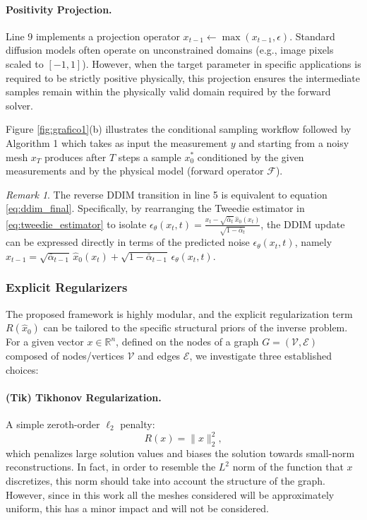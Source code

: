 \documentclass[a4paper,11pt]{article}
\renewcommand{\varepsilon}{\epsilon}
\newcommand{\R}{{\mathbb R}}
\theoremstyle{definition}
\theoremstyle{plain}
\theoremstyle{remark}
\newtheorem{rem}{Remark}
\begin{document}
\paragraph{Positivity Projection.} Line 9 implements a projection operator $x_{t-1} \leftarrow \max(x_{t-1}, \epsilon)$. Standard diffusion models often operate on unconstrained domains (e.g., image pixels scaled to $[-1, 1]$). However, when the target parameter in specific applications  is required to be strictly positive physically, this projection ensures the intermediate samples remain within the physically valid domain required by the forward solver.

\vspace{0.2cm}

Figure \ref{fig:grafico1}(b) illustrates the conditional sampling workflow followed by Algorithm 1 which takes as input the measurement $y$ and starting from a noisy mesh $x_T$ produces after $T$ steps a sample $x_0^*$ conditioned by the given measurements and by the physical model (forward operator $\mathcal{F}$).

\begin{rem}
The reverse DDIM transition in line 5 is equivalent to equation \eqref{eq:ddim_final}. Specifically, by rearranging the Tweedie estimator in \eqref{eq:tweedie_estimator} to isolate $\varepsilon_\theta(x_t,t) = \frac{x_t - \sqrt{\bar\alpha_t}\,\hat x_0(x_t)}{\sqrt{1-\bar\alpha_t}}$, the DDIM update can be expressed directly in terms of the predicted noise $\varepsilon_\theta(x_t,t)$, namely $x_{t-1} = \sqrt{\bar\alpha_{t-1}}\,\hat x_0(x_t) + \sqrt{1-\bar\alpha_{t-1}}\,\varepsilon_\theta(x_t,t).$
 \end{rem}
\subsubsection{Explicit Regularizers}
The proposed framework is highly modular, and the explicit regularization term $R(\hat{x}_0)$ can be tailored to the specific structural priors of the inverse problem. For a given vector $x \in \R^n$, defined on the nodes of a graph 
 $G = (\mathcal{V},\mathcal{E})$  composed of nodes/vertices $\mathcal{V}$ and edges $\mathcal{E}$, we investigate three established choices:

\paragraph{(Tik) Tikhonov Regularization.} A simple zeroth-order $\ell_2$ penalty:
\begin{equation}
	R(x) = \|x\|_2^2,
\label{eq:regT}
\end{equation}
which penalizes large solution values and biases the solution towards small-norm reconstructions. In fact, in order to resemble the $L^2$ norm of the function that $x$ discretizes, this norm should take into account the structure of the graph. However, since in this work all the meshes considered will be approximately uniform, this has a minor impact and will not be considered.
\end{document}

